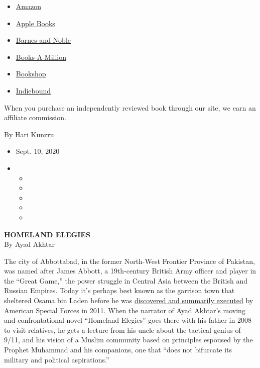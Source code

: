 \begin{itemize}
\tightlist
\item
  \href{https://www.amazon.com/gp/search?index=books\&tag=NYTBSREV-20\&field-keywords=Homeland+Elegies+Ayad+Akhtar}{Amazon}
\item
  \href{https://du-gae-books-dot-nyt-du-prd.appspot.com/buy?title=Homeland+Elegies\&author=Ayad+Akhtar}{Apple
  Books}
\item
  \href{https://www.anrdoezrs.net/click-7990613-11819508?url=https\%3A\%2F\%2Fwww.barnesandnoble.com\%2Fw\%2F\%3Fean\%3D9780316496421}{Barnes
  and Noble}
\item
  \href{https://www.anrdoezrs.net/click-7990613-35140?url=https\%3A\%2F\%2Fwww.booksamillion.com\%2Fp\%2FHomeland\%2BElegies\%2FAyad\%2BAkhtar\%2F9780316496421}{Books-A-Million}
\item
  \href{https://bookshop.org/a/3546/9780316496421}{Bookshop}
\item
  \href{https://www.indiebound.org/book/9780316496421?aff=NYT}{Indiebound}
\end{itemize}

When you purchase an independently reviewed book through our site, we
earn an affiliate commission.

By Hari Kunzru

\begin{itemize}
\item
  Sept. 10, 2020
\item
  \begin{itemize}
  \item
  \item
  \item
  \item
  \item
  \end{itemize}
\end{itemize}

\textbf{HOMELAND ELEGIES}\\
By Ayad Akhtar

The city of Abbottabad, in the former North-West Frontier Province of
Pakistan, was named after James Abbott, a 19th-century British Army
officer and player in the ``Great Game,'' the power struggle in Central
Asia between the British and Russian Empires. Today it's perhaps best
known as the garrison town that sheltered Osama bin Laden before he was
\href{https://www.nytimes3xbfgragh.onion/2011/05/02/world/asia/osama-bin-laden-is-killed.html}{discovered
and summarily executed} by American Special Forces in 2011. When the
narrator of Ayad Akhtar's moving and confrontational novel ``Homeland
Elegies'' goes there with his father in 2008 to visit relatives, he gets
a lecture from his uncle about the tactical genius of 9/11, and his
vision of a Muslim community based on principles espoused by the Prophet
Muhammad and his companions, one that ``does not bifurcate its military
and political aspirations.''

